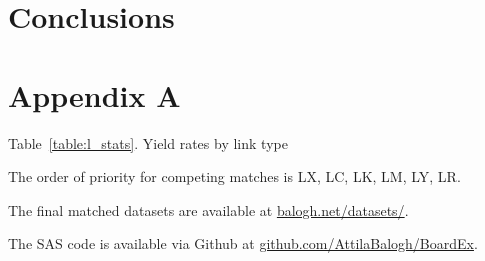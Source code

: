 \documentclass[12pt]{article}
\begin{document}
\section{Conclusions} \label{sec:Conclusions}

\clearpage
\section{Appendix A} \label{sec:Appendix}

\begin{center}
Table~\ref{table:l_stats}. Yield rates by link type\label{table:l_stats}

\end{center}

The order of priority for competing matches is LX, LC, LK, LM, LY, LR.

The final matched datasets are available at \href{https://balogh.net/datasets/}{balogh.net/datasets/}.

The SAS code is available via Github at \href{https://github.com/AttilaBalogh/BoardEx}{github.com/AttilaBalogh/BoardEx}.

\clearpage





\end{document}
